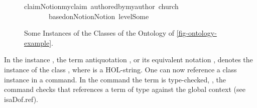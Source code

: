 \begin{isabellebody}
\begin{isamarkuptext}
\begin{figure}
\begin{isarbox}
\begin{isabelle}
claimNotion{\isacharcolon}{\kern0pt}{\isacharcolon}{\kern0pt}myclaim{\isacharcomma}{\kern0pt}\ authored{\isacharunderscore}{\kern0pt}by{\isacharequal}{\kern0pt}{\isachardoublequoteopen}{\isacharbraceleft}{\kern0pt}{\isacharat}{\kern0pt}{\isacharbraceleft}{\kern0pt}myauthor\ {\isasymopen}church{\isasymclose}{\isacharbraceright}{\kern0pt}{\isacharbraceright}{\kern0pt}{\isachardoublequoteclose}\isanewline
\ \ \ \ \ \ {\isacharcomma}{\kern0pt}\ based{\isacharunderscore}{\kern0pt}on{\isacharequal}{\kern0pt}{\isachardoublequoteopen}{\isacharbrackleft}{\kern0pt}{\isasymopen}Notion{}{\isasymclose}{\isacharcomma}{\kern0pt}{\isasymopen}Notion{}{\isasymclose}{\isacharbrackright}{\kern0pt}{\isachardoublequoteclose}{\isacharcomma}{\kern0pt}\ level{\isacharequal}{\kern0pt}{\isachardoublequoteopen}Some\ {}{\isachardoublequoteclose}{\isacharbrackright}{\kern0pt}{\isacartoucheopen}{\isacartoucheclose}
\end{isabelle}
\end{isarbox}
\caption{Some Instances of the Classes of the Ontology of \autoref{fig-ontology-example}.}
\label{fig-instances-example}
\end{figure}
  In the instance , the term antiquotation  ,
  or its equivalent notation , denotes
  the instance  of the class ,
  where  is a HOL-string.
  One can now reference a class instance in a  command.
  In the command  
  the term  is type-checked, \ie, the command  checks that
   references a term of type  against the global context
  (see \csname isaDof.ref).
\end{isamarkuptext}\isamarkuptrue%


\end{isabellebody}
